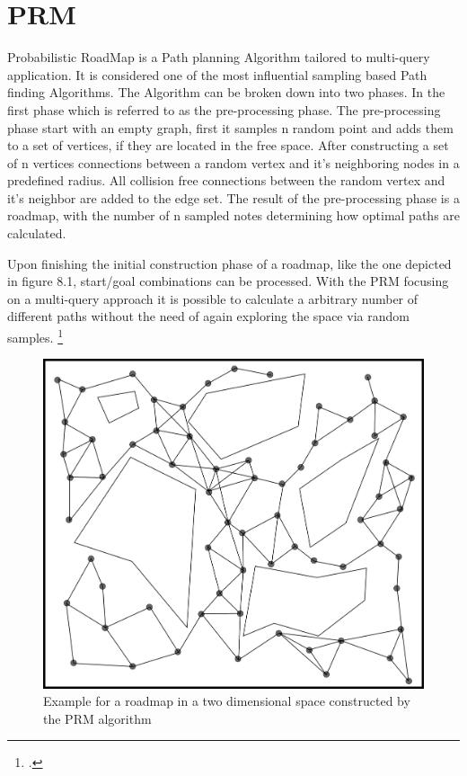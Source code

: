 \section{PRM}

Probabilistic RoadMap is a Path planning Algorithm tailored to multi-query application. It is considered one of the most influential sampling based Path finding Algorithms. 
The Algorithm can be broken down into two phases. In the first phase which is referred to as the pre-processing phase. The pre-processing phase start with an empty graph, first it samples n random point and adds them to a set of vertices, if they are located in the free space. After constructing a set of n vertices connections between a random vertex and it's neighboring nodes in a predefined radius. All collision free connections between the random vertex and it's neighbor are added to the edge set. The result of the pre-processing phase is a roadmap, with the number of n sampled notes determining how optimal paths are calculated. 

Upon finishing the initial construction phase of a roadmap, like the one depicted in figure 8.1, start/goal combinations can be processed. With the PRM focusing on a multi-query approach it is possible to calculate a arbitrary number of different paths without the need of again exploring the space via random samples.
\footcite{Karaman2011}

\begin{figure}[]
	\centering
	\includegraphics[width=0.8\linewidth]{img/PRMRoadmap}
	\caption{Example for a roadmap in a two dimensional space constructed by the PRM algorithm}
	\label{fig:ros_master_reg}
\end{figure}


